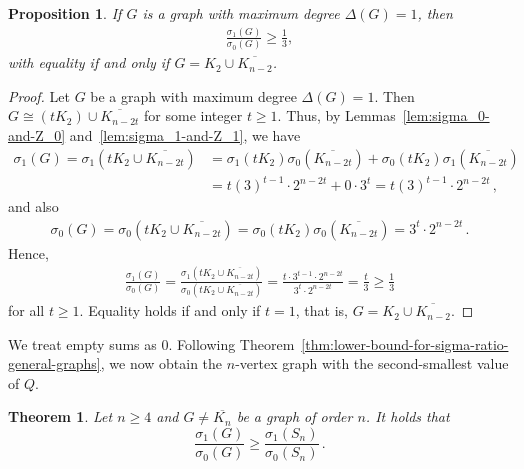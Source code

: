 \documentclass[a4paper,12pt]{amsart}
\newtheorem{thm}{Theorem}
\newtheorem{prop}{Proposition}
\begin{document}
\begin{prop}
\label{thm:lower-bound-for-sigma-ratio-of-general-graphs-of-max-degree-1}
    If $G$ is a graph with maximum degree $\Delta(G) =1$, then 
    \begin{align*}
        \frac{\sigma_1(G)}{\sigma_0(G)} \ge \frac{1}{3},
    \end{align*}
    with equality if and only if $G = K_2 \cup \overline{K_{n-2}}$.
\end{prop}

\begin{proof}
    Let $G$ be a graph with maximum degree $\Delta(G) =1$. Then $G \cong (tK_2) \cup \overline{K_{n-2t}}$ for some integer $t\ge 1$. Thus, by Lemmas~\ref{lem:sigma_0-and-Z_0} and~\ref{lem:sigma_1-and-Z_1}, we have
    \begin{align*}
        \sigma_1(G) = \sigma_1(tK_2 \cup \overline{K_{n-2t}}) &= \sigma_1(t K_2)\sigma_0(\overline{K_{n-2t}}) + \sigma_0(tK_2) \sigma_1(\overline{K_{n-2t}})\\
        &=t(3)^{t-1}\cdot 2^{n-2t} + 0\cdot 3^t =t(3)^{t-1}\cdot 2^{n-2t}\,,
    \end{align*}
   and also
    \begin{align*}
        \sigma_0(G) = \sigma_0(tK_2 \cup \overline{K_{n-2t}}) = \sigma_0(tK_2) \sigma_0(\overline{K_{n-2t}}) = 3^t \cdot 2^{n-2t}\,.
    \end{align*}
    Hence, 
        \begin{align*}
        \frac{\sigma_1(G)}{\sigma_0(G)} = \frac{\sigma_1(tK_2 \cup \overline{K_{n-2t}})}{\sigma_0(tK_2 \cup \overline{K_{n-2t}})} = \frac{t\cdot 3^{t-1}\cdot 2^{n-2t}}{3^t \cdot 2^{n-2t}} = \frac{t}{3} \geq  \frac{1}{3}
    \end{align*}
 for all $t\ge 1$. Equality holds if and only if $t=1$, that is, $G = K_2 \cup \overline{K_{n-2}}$.
\end{proof}

\medskip
We treat empty sums as $0$. Following Theorem~\ref{thm:lower-bound-for-sigma-ratio-general-graphs}, we now obtain the $n$-vertex graph with the second-smallest value of $Q$.


\begin{thm}
\label{Thm:DiscMin} Let $n\geq 4$ and $G\neq \overline{K_n}$ be a graph of order $n$. It holds that
$$
\frac{\sigma_1(G)}{\sigma_0(G)}\geq \frac{\sigma_1(S_n)}{\sigma_0(S_n)}\,.
$$
\end{thm}
\end{document}

